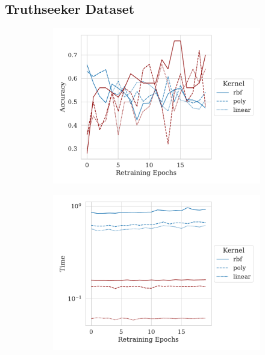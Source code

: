 \documentclass[fonts]{icst}
\begin{document}
\begin{appendices}
\section{Truthseeker Dataset}
\label{appendix-2}
\begin{figure}[h!]
     \centering
     \begin{subfigure}{0.47\textwidth}
         \centering
         \includegraphics[width=\textwidth]{./truthseeker/retrain_accuracy.pdf}
     \end{subfigure}
     \hfill
     \begin{subfigure}{0.47\textwidth}
         \centering
         \includegraphics[width=\textwidth]{./truthseeker/retrain_time.pdf}
     \end{subfigure}

\end{figure}
\end{appendices}
\end{document}
